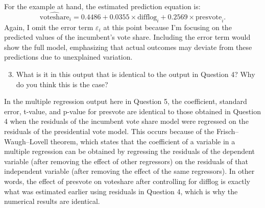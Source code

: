 \documentclass[
]{article}
\begin{document}
\noindent For the example at hand, the estimated prediction equation is:
\[
\hat{\text{voteshare}}_i = 0.4486 + 0.0355 \times \text{difflog}_i + 0.2569 \times \text{presvote}_i.
\]
Again, I omit the error term $\varepsilon_i$ at this point because I'm focusing on the predicted values of the incumbent’s vote share. Including the error term would show the full model, emphasizing that actual outcomes may deviate from these predictions due to unexplained variation.

\vspace{.5cm}

\begin{enumerate}\setcounter{enumi}{2}
	\item What is it in this output that is identical to the output in Question 4? Why do you think this is the case?
\end{enumerate}
In the multiple regression output here in Question 5, the coefficient, standard error, t-value, and p-value for presvote are identical to those obtained in Question 4 when the residuals of the incumbent vote share model were regressed on the residuals of the presidential vote model. This occurs because of the Frisch–Waugh–Lovell theorem, which states that the coefficient of a variable in a multiple regression can be obtained by regressing the residuals of the dependent variable (after removing the effect of other regressors) on the residuals of that independent variable (after removing the effect of the same regressors). In other words, the effect of presvote on voteshare after controlling for difflog is exactly what was estimated earlier using residuals in Question 4, which is why the numerical results are identical.
\end{document}
